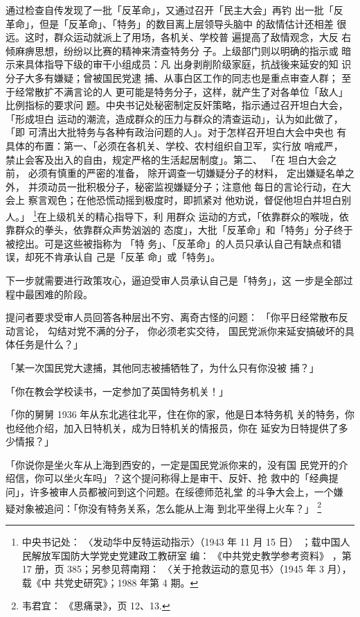 通过检查自传发现了一批「反革命」，又通过召开「民主大会」再钓 出一批「反
革命」，但是「反革命」、「特务」的数目离上层领导头脑中 的敌情估计还相差
很远。这时，群众运动就派上了用场，各机关、学校普 遍提高了敌情观念，大反
右倾麻痹思想，纷纷以比赛的精神来清查特务分 子。上级部门则以明确的指示或
暗示来具体指导下级的审干小组成员：凡 出身剥削阶级家庭，抗战後来延安的知
识分子大多有嫌疑；曾被国民党逮 捕、从事白区工作的同志也是重点审查人群；
至于经常散扩不满言论的人 更可能是特务分子，这样，就产生了对各单位「敌人」
比例指标的要求问 题。中央书记处秘密制定反奸策略，指示通过召开坦白大会，
「形成坦白 运动的潮流，造成群众的压力与群众的清查运动」，认为如此做了，
「即 可清出大批特务与各种有政治问题的人」。对于怎样召开坦白大会中央也 有
具体的布置：第一、「必须在各机关、学校、农村组织自卫军，实行放 哨戒严，
禁止会客及出入的自由，规定严格的生活起居制度」。第二、 「在 坦白大会之前，
必须有慎重的严密的准备， 除开调查一切嫌疑分子的材料， 定出嫌疑名单之外，
并须动员一批积极分子，秘密监视嫌疑分子；注意他 每日的言论行动，在大会上
察言观色；在他恐慌动摇到极度时，即抓紧对 他劝说，督促他坦白并坦白别人。」
\footnote{中央书记处： 〈发动华中反特运动指示〉（1943 年 11 月 15 日）
；载中国人民解放军国防大学党史党建政工教研室 编： 《中共党史教学参考资料》
，第 17 册，页 385；另参见蒋南翔： 〈关于抢救运动的意见书〉（1945 年 3
月），载《中 共党史研究》；1988 年第 4 期。}在上级机关的精心指导下，利
用群众 运动的方式，「依靠群众的喉咙，依靠群众的拳头，依靠群众声势汹汹的
态度」，大批「反革命」和「特务」分子终于被挖出。可是这些被指称为 「特
务」、「反革命」的人员只承认自己有缺点和错误，却死不肯承认自 己是「反革
命」或「特务」。

下一步就需要进行政策攻心，逼迫受审人员承认自己是「特务」，这
一步是全部过程中最困难的阶段。

提问者要求受审人员回答各种层出不穷、离奇古怪的问题：
「你平日经常散布反动言论，
勾结对党不满的分子，
你必须老实交待，
国民党派你来延安搞破坏的具体任务是什么？」

「某一次国民党大逮捕，其他同志被捕牺牲了，为什么只有你没被
捕？」

「你在教会学校读书，一定参加了英国特务机关！」

「你的舅舅 1936 年从东北逃往北平，住在你的家，他是日本特务机
关的特务，你也经他介绍，加入日特机关，成为日特机关的情报员，你在
延安为日特提供了多少情报？」

「你说你是坐火车从上海到西安的，一定是国民党派你来的，没有国 民党开的介
绍信，你可以坐火车吗」？这个提问称得上是审干、反奸、抢 救中的「经典提
问」，许多被审人员都被问到这个问题。在绥德师范礼堂 的斗争大会上，一个嫌
疑对象被追问：「你没有特务关系，怎么能从上海 到北平坐得上火车？」
\footnote{韦君宜： 《思痛录》，页 12、13.}

